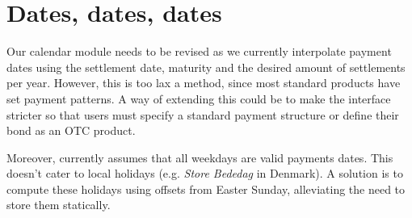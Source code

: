 \section{Dates, dates, dates}

Our calendar module needs to be revised as we currently interpolate 
payment dates using the settlement date, maturity and the desired amount of 
settlements per year. However, this is too lax a method, since most standard 
products have set payment patterns. A way of extending this could be to make
the interface stricter so that users must specify a standard payment 
structure or define their bond as an OTC product.

Moreover, \hql currently assumes that all weekdays are valid payments dates. 
This doesn’t cater to local holidays (e.g. \emph{Store Bededag} in Denmark). A 
solution is to compute these holidays using offsets from Easter Sunday, 
alleviating the need to store them statically.\\

